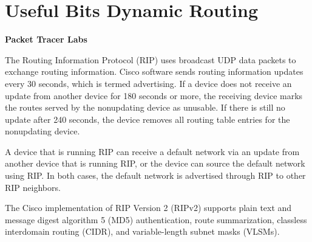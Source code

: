 \documentclass[../EngineeringJournal_CDavis.tex]{subfiles}
\begin{document}

\chapter*{Useful Bits \linebreak[1] Dynamic Routing \hspace*{\fill}{2020}}
\noindent\textbf{{Packet Tracer Labs} }                             


\hspace{0.2cm}
\begin{tcolorbox}[width=6.3in]
\scriptsize
The Routing Information Protocol (RIP) uses broadcast UDP data packets to exchange routing information. Cisco software sends routing information updates every 30 seconds, which is termed advertising. If a device does not receive an update from another device for 180 seconds or more, the receiving device marks the routes served by the nonupdating device as unusable. If there is still no update after 240 seconds, the device removes all routing table entries for the nonupdating device.
\end{tcolorbox}
\hspace{0.2cm}
\normalsize  

\hspace{0.2cm}
\begin{tcolorbox}[width=6.3in]
\scriptsize
A device that is running RIP can receive a default network via an update from another device that is running RIP, or the device can source the default network using RIP. In both cases, the default network is advertised through RIP to other RIP neighbors.
\end{tcolorbox}
\hspace{0.2cm}
\normalsize  

\hspace{0.2cm}
\begin{tcolorbox}[width=6.3in]
\scriptsize
The Cisco implementation of RIP Version 2 (RIPv2) supports plain text and message digest algorithm 5 (MD5) authentication, route summarization, classless interdomain routing (CIDR), and variable-length subnet masks (VLSMs).
\end{tcolorbox}
\hspace{0.2cm}
\normalsize  
\end{document}
